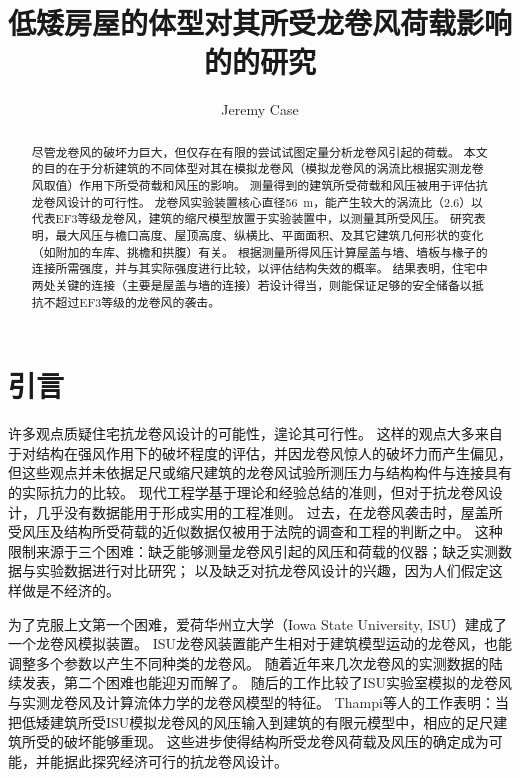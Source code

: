 \documentclass{ctexart}
\title{低矮房屋的体型对其所受龙卷风荷载影响的的研究}
\author{Jeremy Case}
\date{}
\begin{document}
\maketitle

\begin{abstract}
尽管龙卷风的破坏力巨大，但仅存在有限的尝试试图定量分析龙卷风引起的荷载。
本文的目的在于分析建筑的不同体型对其在模拟龙卷风（模拟龙卷风的涡流比根据实测龙卷风取值）作用下所受荷载和风压的影响。
测量得到的建筑所受荷载和风压被用于评估抗龙卷风设计的可行性。
龙卷风实验装置核心直径\SI{56}{m}，能产生较大的涡流比（\num{2.6}）以代表EF3等级龙卷风，建筑的缩尺模型放置于实验装置中，以测量其所受风压。
研究表明，最大风压与檐口高度、屋顶高度、纵横比、平面面积、及其它建筑几何形状的变化（如附加的车库、挑檐和拱腹）有关。
根据测量所得风压计算屋盖与墙、墙板与椽子的连接所需强度，并与其实际强度进行比较，以评估结构失效的概率。
结果表明，住宅中两处关键的连接（主要是屋盖与墙的连接）若设计得当，则能保证足够的安全储备以抵抗不超过EF3等级的龙卷风的袭击。
\end{abstract}

\section{引言}
许多观点质疑住宅抗龙卷风设计的可能性，遑论其可行性。
这样的观点大多来自于对结构在强风作用下的破坏程度的评估，并因龙卷风惊人的破坏力而产生偏见，
但这些观点并未依据足尺或缩尺建筑的龙卷风试验所测压力与结构构件与连接具有的实际抗力的比较。
现代工程学基于理论和经验总结的准则，但对于抗龙卷风设计，几乎没有数据能用于形成实用的工程准则。
过去，在龙卷风袭击时，屋盖所受风压及结构所受荷载的近似数据仅被用于法院的调查和工程的判断之中。
这种限制来源于三个困难：缺乏能够测量龙卷风引起的风压和荷载的仪器；缺乏实测数据与实验数据进行对比研究；
以及缺乏对抗龙卷风设计的兴趣，因为人们假定这样做是不经济的。

为了克服上文第一个困难\cite{haan2008design}，爱荷华州立大学（Iowa State University, ISU）建成了一个龙卷风模拟装置。
ISU龙卷风装置能产生相对于建筑模型运动的龙卷风，也能调整多个参数以产生不同种类的龙卷风。
随着近年来几次龙卷风的实测数据的陆续发表\cite{karstens2010near}\cite{lee2005diagnosed}\cite{wurman2002multiple}，第二个困难也能迎刃而解了。
随后的工作比较了ISU实验室模拟的龙卷风与实测龙卷风及计算流体力学的龙卷风模型的特征\cite{sarkar2005laboratory}。
Thampi等人的工作\cite{thampi2011finite}表明：当把低矮建筑所受ISU模拟龙卷风的风压输入到建筑的有限元模型中，相应的足尺建筑所受的破坏能够重现。
这些进步使得结构所受龙卷风荷载及风压的确定成为可能，并能据此探究经济可行的抗龙卷风设计。
\end{document}
